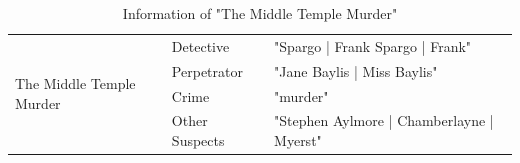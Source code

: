 \documentclass{article}
\begin{document}
\begin{table}[htbp]
\centering
\caption{Information of "The Middle Temple Murder"}
\begin{tabular}{@{}l|l|l@{}}
\toprule
\multirow{6}{*}{The Middle Temple Murder} & Detective      & "Spargo | Frank Spargo | Frank"                                                                                                                                                                                                                                                                                                                                                                                                                                                                                                                               \\ \cmidrule(l){2-3} 
                                          & Perpetrator    & "Jane Baylis | Miss Baylis"                                                                                                                                                                                                                                                                                                                                                                                                                                                                                                                                 \\ \cmidrule(l){2-3} 
                                          & Crime          & "murder"                                                                                                                                                                                                                                                                                                                                                                                                                                                                                                                                                  \\ \cmidrule(l){2-3} 
                                          & Other Suspects & "Stephen Aylmore | Chamberlayne | Myerst"                                                                                                                                                                                                                                                                                                                                                                                                                                                                                                                     \\ \cmidrule(l){2-3} 

\end{tabular}
\end{table}
\end{document}
